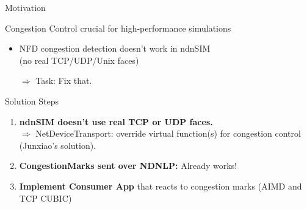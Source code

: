 



\begin{frame}{Motivation}

Congestion Control crucial for high-performance simulations
\pause

\begin{itemize}
\item NFD congestion detection doesn't work in ndnSIM\\ (no real TCP/UDP/Unix faces)
\pause
\item[$\Rightarrow$] Task: Fix that. 
\end{itemize}
\end{frame}



\begin{frame}{Solution Steps}

\begin{enumerate}
\item \textbf{ndnSIM doesn't use real TCP or UDP faces.}\\
$\Rightarrow$ NetDeviceTransport: override
virtual function(s) for congestion control (Junxiao's solution).
\pause

\item \textbf{CongestionMarks sent over NDNLP:} Already works! 
\pause

\item \textbf{Implement Consumer App} that reacts to congestion marks (AIMD and TCP CUBIC)

\end{enumerate}

\end{frame}


